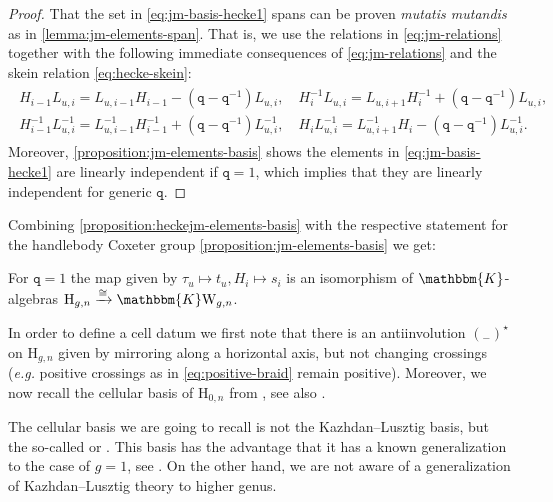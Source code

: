 \documentclass[a4paper,11pt]{amsart}
\let\emph\relax
\newcommand{\eg}{\textsl{e.g.}}
\newcommand{\muta}{\textsl{mutatis mutandis}}
\newcommand{\placeholder}{{}_{-}}
\newcommand{\setstuff}[1]{\mathrm{#1}}
\newcommand{\KK}{\mathbbm{K}}
\newcommand{\varsym}[1]{\mathtt{#1}}
\newcommand{\jm}{L}
\newcommand{\qvar}{\varsym{q}}
\numberwithin{equation}{section}
\let\fullref\autoref
\begin{document}
\begin{proof}
That the set in \eqref{eq:jm-basis-hecke1} spans can be proven {\muta} as 
in \fullref{lemma:jm-elements-span}. 
That is, we use the relations in \eqref{eq:jm-relations} 
together with the following immediate consequences 
of \eqref{eq:jm-relations} and the skein relation \eqref{eq:hecke-skein}:
\begin{gather}\label{eq:hecke-pull}
\begin{gathered}
H_{i-1}\jm_{u,i}
=
\jm_{u,i-1}H_{i-1}
-(\qvar-\qvar^{-1})\jm_{u,i}
,\quad
H_{i}^{-1}\jm_{u,i}
=
\jm_{u,i+1}H_{i}^{-1}
+(\qvar-\qvar^{-1})\jm_{u,i}
,\\
H_{i-1}^{-1}\jm_{u,i}^{-1}
=
\jm_{u,i-1}^{-1}H_{i-1}^{-1}
+(\qvar-\qvar^{-1})\jm_{u,i}^{-1}
,\quad
H_{i}\jm_{u,i}^{-1}
=
\jm_{u,i+1}^{-1}H_{i}
-(\qvar-\qvar^{-1})\jm_{u,i}^{-1}.
\end{gathered}
\end{gather}
Moreover, 
\fullref{proposition:jm-elements-basis} shows the elements in \eqref{eq:jm-basis-hecke1} are 
linearly independent if $\qvar=1$, which implies that they are linearly independent for generic $\qvar$.
\end{proof}

Combining \fullref{proposition:heckejm-elements-basis} 
with the respective 
statement for the handlebody Coxeter 
group \fullref{proposition:jm-elements-basis} we get:

\begin{corollary}
For $\qvar=1$
the map given by
$\tau_{u}\mapsto t_{u},H_{i}\mapsto s_{i}$
is an isomorphism of $\KK$-algebras $\setstuff{H}_{g,n}\xrightarrow{\cong}\KK\setstuff{W}_{g,n}$.
\end{corollary}

In order to define a cell datum we first note that
there is an antiinvolution $(\placeholder)^{\star}$ 
on $\setstuff{H}_{g,n}$ given by mirroring along a horizontal 
axis, but not changing crossings ({\eg} positive crossings
as in \eqref{eq:positive-braid} remain positive).
Moreover, we now recall the 
cellular basis of $\setstuff{H}_{0,n}$ from \cite{Mu-typea-hecke}, see also \cite[Chapter 3]{Ma-hecke-schur}. 

\begin{remark}
The cellular basis we are going to recall is not the Kazhdan--Lusztig 
basis, but the so-called \emph{Murphy basis} or
\emph{standard basis}. This basis 
has the advantage that it has a known generalization to the case of $g=1$, 
see \cite{DiJaMa-cyclotomic-q-schur}. 
On the other hand, we are not aware of a generalization 
of Kazhdan--Lusztig theory to higher genus.
\end{remark}
\end{document}
